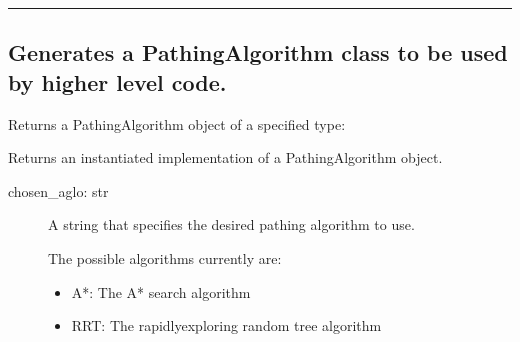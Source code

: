 \documentclass[letterpaper,10pt,english]{sphinxmanual}
\begin{document}
\begin{fulllineitems}
\label{\detokenize{test:algo_factory.py}}
\end{fulllineitems}



\bigskip\hrule\bigskip



\subsection{Generates a PathingAlgorithm class to be used by higher level code.}
\label{\detokenize{test:generates-a-pathingalgorithm-class-to-be-used-by-higher-level-code}}
\sphinxAtStartPar
{}
Returns a PathingAlgorithm object of a specified type:

\begin{sphinxVerbatim}[commandchars=\\\{\}]
    

   
   
   
\end{sphinxVerbatim}

\begin{sphinxVerbatim}[commandchars=\\\{\}]
    
\end{sphinxVerbatim}

\sphinxAtStartPar
Returns an instantiated implementation of a PathingAlgorithm object.

\sphinxAtStartPar
{}
\begin{description}
\item[{chosen\_aglo: str}] \leavevmode
\sphinxAtStartPar
A string that specifies the desired pathing algorithm to use.

\sphinxAtStartPar
The possible algorithms currently are:
\begin{itemize}
\item {} 
\sphinxAtStartPar
A*: The A* search algorithm

\item {} 
\sphinxAtStartPar
RRT: The rapidly\sphinxhyphen{}exploring random tree algorithm

\end{itemize}

\end{description}
\end{document}
